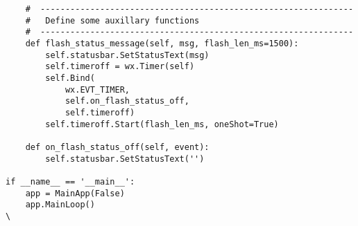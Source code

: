 \documentclass[12pt]{article}
\begin{document}
\begin{verbatim}
    #  ---------------------------------------------------------------        
    #   Define some auxillary functions
    #  ---------------------------------------------------------------        
    def flash_status_message(self, msg, flash_len_ms=1500):
        self.statusbar.SetStatusText(msg)
        self.timeroff = wx.Timer(self)
        self.Bind(
            wx.EVT_TIMER, 
            self.on_flash_status_off, 
            self.timeroff)
        self.timeroff.Start(flash_len_ms, oneShot=True)
    
    def on_flash_status_off(self, event):
        self.statusbar.SetStatusText('')
                
if __name__ == '__main__':
    app = MainApp(False)
    app.MainLoop()
\
\end{verbatim}
\end{document}
